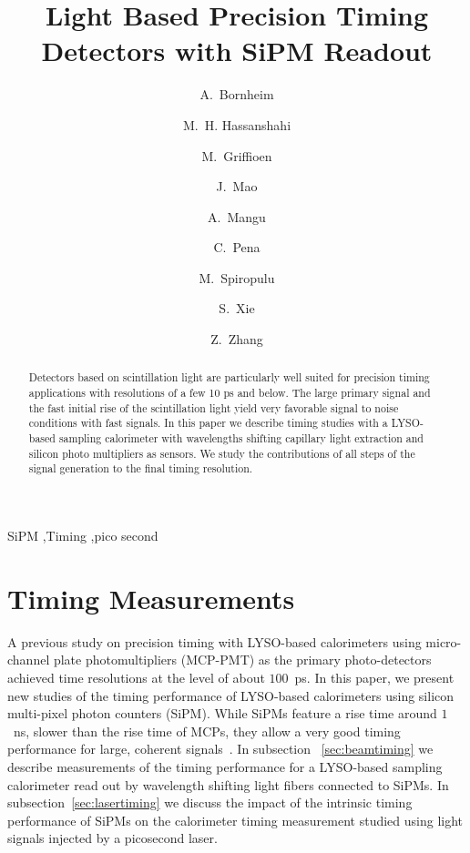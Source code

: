 \documentclass[preprint,1p]{elsarticle}
\begin{document}
  
\linenumbers

\begin{frontmatter}

\title{Light Based Precision Timing Detectors with SiPM Readout}

\author[1]{A.~Bornheim}
\author[2]{M.~H. Hassanshahi}
\author[1]{M.~Griffioen}
\author[1]{J.~Mao}
\author[1]{A.~Mangu}
\author[1]{C.~Pena}
\author[1]{M.~Spiropulu}
\author[1]{S.~Xie }
\author[1]{Z.~Zhang}
\address[1]{California Institute of Technology, Pasadena, CA, USA}
\address[2]{Institute for Research in Fundamental Science, Tehran, Iran}


\begin{abstract}
Detectors based on scintillation light are particularly well suited for precision timing applications with 
resolutions of a few 10 ps and below. The large primary signal and the fast initial rise of the scintillation
light yield very favorable signal to noise conditions with fast signals. In this paper we describe timing 
studies with a LYSO-based sampling calorimeter with wavelengths shifting capillary light extraction and silicon
photo multipliers as sensors. We study the contributions of all steps of the signal generation to 
the final timing resolution. 
\end{abstract}

\begin{keyword}
SiPM \sep Timing \sep pico second
\end{keyword}

\end{frontmatter}

%
%

%
%
  
%
%
  
%
%

\section{Timing Measurements} 

A previous study on precision timing with LYSO-based calorimeters
\cite{lysotiming} using micro-channel plate photomultipliers (MCP-PMT) 
as the primary photo-detectors achieved time resolutions at the level of 
about $100$~ps. In this paper, we present new studies of the
timing performance of LYSO-based calorimeters using silicon multi-pixel 
photon counters (SiPM). While SiPMs feature a rise time around
$1$~ns, slower than the rise time of MCPs, they allow a very good timing
performance for large, coherent signals~\cite{aashrita}. In subsection
~\ref{sec:beamtiming} we describe measurements of the timing performance 
for a LYSO-based sampling calorimeter read out by wavelength shifting 
light fibers connected to SiPMs. In subsection~\ref{sec:lasertiming}
we discuss the impact of the intrinsic timing performance of SiPMs on 
the calorimeter timing measurement studied using light signals injected
by a picosecond laser.
\end{document}
